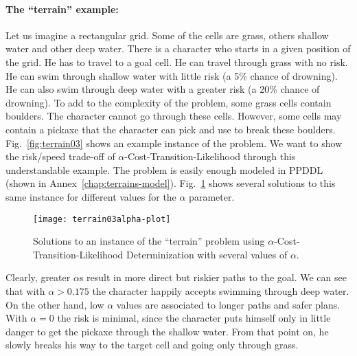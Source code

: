 \documentclass[../root.tex]{subfiles}
\begin{document}
\paragraph{The ``terrain'' example:} Let us imagine a rectangular grid. Some
of the cells are grass, others shallow water and other
deep water. There is a character who starts in a given position of the grid. He has to
travel to a goal cell. He can travel through grass with no risk. He
can swim through shallow water with little risk (a 5\% chance of drowning).
He can also swim through deep water with a greater risk (a 20\% chance of
drowning). To add to the complexity of the problem, some grass cells contain
boulders. The character cannot go through these cells. However, some cells
may contain a pickaxe that the character can pick and use to break these boulders.
Fig.~\ref{fig:terrain03} shows an example instance of the problem.
We want to show the risk/speed trade-off of $\alpha$-Cost-Transition-Likelihood
through this understandable example. The problem is easily enough modeled in PPDDL
(shown in Annex~\ref{chap:terrains-model}). Fig.~\ref{fig:terrain03alpha-plot} shows
several solutions to this same instance for different values for the
$ \alpha $ parameter.

\begin{figure}[tbh]
	\centering
	\texttt{[image: terrain03alpha-plot]}
	\caption{Solutions to an instance of the ``terrain'' problem using
			 $\alpha$-Cost-Transition-Likelihood Determinization with
			several values of $ \alpha $. }
	\label{fig:terrain03alpha-plot}
\end{figure}

Clearly, greater $\alpha$s result in more direct but riskier paths to the goal.
We can see that with $ \alpha > 0.175 $ the character happily accepts
swimming through deep water. On the other hand, low $ \alpha $ values are associated
to longer paths and safer plans. With $ \alpha = 0 $ the risk is minimal, since the
character puts himself
only in little danger to get the pickaxe through the shallow water. From that point on,
he slowly breaks his way to the target cell and going only through grass.
\end{document}
